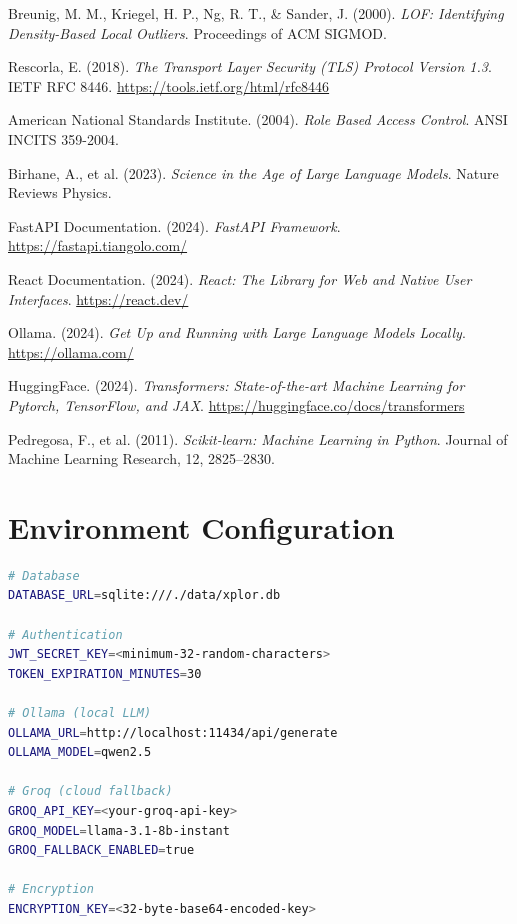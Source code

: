 \documentclass[12pt,a4paper]{report}
\begin{document}
\begin{enumerate}[leftmargin=2em, label={[\arabic*]}]
    \item Breunig, M. M., Kriegel, H. P., Ng, R. T., \& Sander, J. (2000). \textit{LOF: Identifying Density-Based Local Outliers}. Proceedings of ACM SIGMOD.

    \item Rescorla, E. (2018). \textit{The Transport Layer Security (TLS) Protocol Version 1.3}. IETF RFC 8446. \url{https://tools.ietf.org/html/rfc8446}

    \item American National Standards Institute. (2004). \textit{Role Based Access Control}. ANSI INCITS 359-2004.

    \item Birhane, A., et al. (2023). \textit{Science in the Age of Large Language Models}. Nature Reviews Physics.

    \item FastAPI Documentation. (2024). \textit{FastAPI Framework}. \url{https://fastapi.tiangolo.com/}

    \item React Documentation. (2024). \textit{React: The Library for Web and Native User Interfaces}. \url{https://react.dev/}

    \item Ollama. (2024). \textit{Get Up and Running with Large Language Models Locally}. \url{https://ollama.com/}

    \item HuggingFace. (2024). \textit{Transformers: State-of-the-art Machine Learning for Pytorch, TensorFlow, and JAX}. \url{https://huggingface.co/docs/transformers}

    \item Pedregosa, F., et al. (2011). \textit{Scikit-learn: Machine Learning in Python}. Journal of Machine Learning Research, 12, 2825--2830.

\end{enumerate}

\appendix
\chapter{Environment Configuration}

\begin{lstlisting}[language=bash, caption={Backend .env configuration template}]
# Database
DATABASE_URL=sqlite:///./data/xplor.db

# Authentication
JWT_SECRET_KEY=<minimum-32-random-characters>
TOKEN_EXPIRATION_MINUTES=30

# Ollama (local LLM)
OLLAMA_URL=http://localhost:11434/api/generate
OLLAMA_MODEL=qwen2.5

# Groq (cloud fallback)
GROQ_API_KEY=<your-groq-api-key>
GROQ_MODEL=llama-3.1-8b-instant
GROQ_FALLBACK_ENABLED=true

# Encryption
ENCRYPTION_KEY=<32-byte-base64-encoded-key>
\end{lstlisting}
\end{document}
